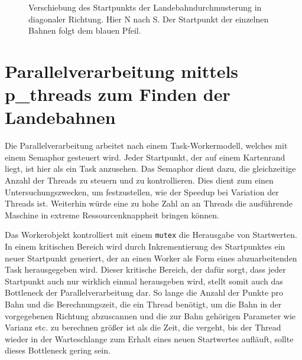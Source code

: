 \documentclass[10pt,a4paper]{report}
\begin{document}
\begin{figure}\label{scanortho}
\centering
{}
\caption{Verschiebung des Startpunkts der Landebahndurchmusterung in diagonaler Richtung. Hier N nach S. Der Startpunkt der einzelnen Bahnen folgt dem blauen Pfeil.}
\end{figure}
\section{Parallelverarbeitung mittels p\_threads zum Finden der Landebahnen}

Die Parallelverarbeitung arbeitet nach einem Task-Workermodell, welches mit einem Semaphor gesteuert wird. Jeder Startpunkt, der auf einem Kartenrand liegt, ist hier als ein Task anzusehen. Das Semaphor dient dazu, die gleichzeitige Anzahl der Threads zu steuern und zu kontrollieren. Dies dient zum einen Untersuchungszwecken, um festzustellen, wie der Speedup bei Variation der Threads ist. Weiterhin würde eine zu hohe Zahl an an Threads die ausführende Maschine in extreme Ressourcenknappheit bringen können.

Das Workerobjekt kontrolliert mit einem \texttt{mutex} die Herausgabe von Startwerten. In einem kritischen Bereich wird durch Inkrementierung des Startpunktes ein neuer Startpunkt generiert, der an einen Worker als Form eines abzuarbeitenden Task herausgegeben wird. Dieser kritische Bereich, der dafür sorgt, dass jeder Startpunkt auch nur wirklich einmal herausgeben wird, stellt somit auch das Bottleneck der Parallelverarbeitung dar. So lange die Anzahl der Punkte pro Bahn und die Berechnungszeit, die ein Thread benötigt, um die Bahn in der vorgegebenen Richtung abzuscannen und die zur Bahn gehörigen Parameter wie Varianz etc. zu berechnen größer ist als die Zeit, die vergeht, bis der Thread wieder in der Warteschlange zum Erhalt eines neuen Startwertes aufläuft, sollte dieses Bottleneck gering sein.
\end{document}
